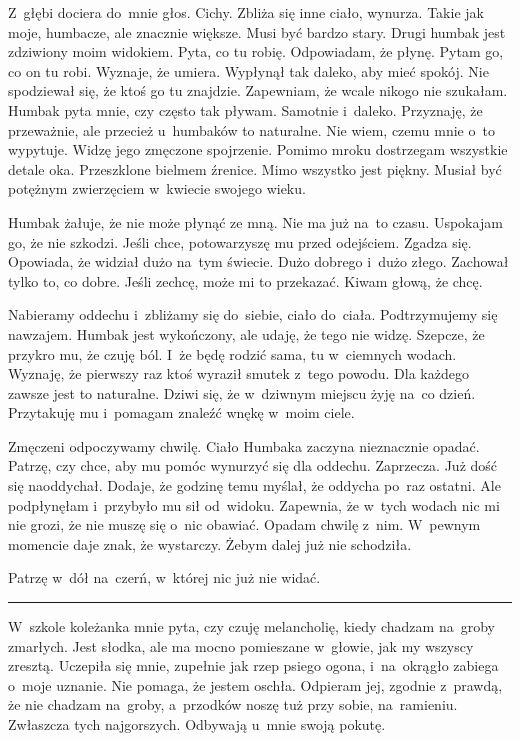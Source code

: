 \documentclass[9pt, a5paper]{memoir}
\begin{document}
Z~głębi dociera do~mnie głos. Cichy. Zbliża się inne ciało, wynurza. Takie jak moje, humbacze, ale znacznie większe. Musi być bardzo stary. Drugi humbak jest zdziwiony moim widokiem. Pyta, co tu robię. Odpowiadam, że płynę. Pytam go, co on tu robi. Wyznaje, że umiera. Wypłynął tak daleko, aby mieć spokój. Nie spodziewał się, że ktoś go tu znajdzie. Zapewniam, że wcale nikogo nie szukałam. Humbak pyta mnie, czy często tak pływam. Samotnie i~daleko. Przyznaję, że przeważnie, ale przecież u~humbaków to naturalne. Nie wiem, czemu mnie o~to wypytuje. Widzę jego zmęczone spojrzenie. Pomimo mroku dostrzegam wszystkie detale oka. Przeszklone bielmem źrenice. Mimo wszystko jest piękny. Musiał być potężnym zwierzęciem w~kwiecie swojego wieku.

Humbak żałuje, że nie może płynąć ze mną. Nie ma już na~to czasu. Uspokajam go, że nie szkodzi. Jeśli chce, potowarzyszę mu przed odejściem. Zgadza się. Opowiada, że widział dużo na~tym świecie. Dużo dobrego i~dużo złego. Zachował tylko to, co dobre. Jeśli zechcę, może mi to przekazać. Kiwam głową, że chcę.

Nabieramy oddechu i~zbliżamy się do~siebie, ciało do~ciała. Podtrzymujemy się nawzajem. Humbak jest wykończony, ale udaję, że tego nie widzę. Szepcze, że przykro mu, że czuję ból. I~że będę rodzić sama, tu w~ciemnych wodach. Wyznaję, że pierwszy raz ktoś wyraził smutek z~tego powodu. Dla każdego zawsze jest to naturalne. Dziwi się, że w~dziwnym miejscu żyję na~co dzień. Przytakuję mu i~pomagam znaleźć wnękę w~moim ciele.

Zmęczeni odpoczywamy chwilę. Ciało Humbaka zaczyna nieznacznie opadać. Patrzę, czy chce, aby mu pomóc wynurzyć się dla oddechu. Zaprzecza. Już dość się naoddychał. Dodaje, że godzinę temu myślał, że oddycha po~raz ostatni. Ale podpłynęłam i~przybyło mu sił od~widoku. Zapewnia, że w~tych wodach nic mi nie grozi, że nie muszę się o~nic obawiać. Opadam chwilę z~nim. W~pewnym momencie daje znak, że wystarczy. Żebym dalej już nie schodziła.

Patrzę w~dół na~czerń, w~której nic już nie widać.

\fancybreak{* \quad * \quad *}

W~szkole koleżanka mnie pyta, czy czuję melancholię, kiedy chadzam na~groby zmarłych. Jest słodka, ale ma mocno pomieszane w~głowie, jak my wszyscy zresztą. Uczepiła się mnie, zupełnie jak rzep psiego ogona, i~na~okrągło zabiega o~moje uznanie. Nie pomaga, że jestem oschła. Odpieram jej, zgodnie z~prawdą, że nie chadzam na~groby, a~przodków noszę tuż przy sobie, na~ramieniu. Zwłaszcza tych najgorszych. Odbywają u~mnie swoją pokutę.
\end{document}
